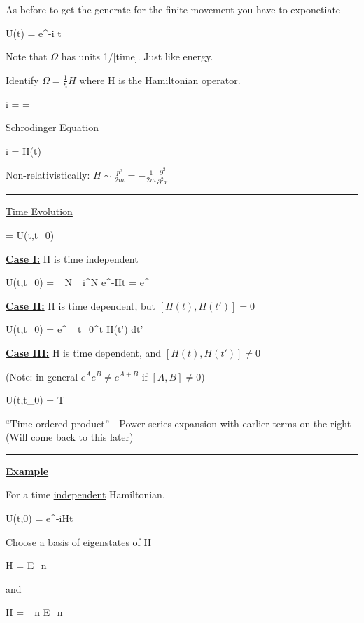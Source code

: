 {As before to get the generate for the finite movement you have to exponetiate

\be
U(t) = e^{-i \Omega t}
\ee

Note that $\Omega$ has units 1/[time].  
Just like energy.

Identify $\Omega = \frac{1}{\hbar}H$  where H is the Hamiltonian operator.


\be
i \ket{\psi} = \Omega \ket{\psi} =  \ket{\psi}
\ee


\underline{Schrodinger Equation}

\be
i \ket{\psi} = H(t) \ket{\psi}
\ee

Non-relativistically:  $H \sim \frac{p^2}{2m} = -\frac{1}{2m} \frac{\partial^2}{\partial^2 x}$

\noindent\rule{\textwidth}{1pt}

\underline{Time Evolution}

\be
{} = U(t,t_0) 
\ee


\textbf{\underline{Case I:}} H is time independent

\be
U(t,t_0) = \lim_{N\rightarrow\infty} \prod\limits_{i}^{N} e^{-H\Delta t}  = e^{}
\ee


\textbf{\underline{Case II:}} H is time dependent, but $[H(t), H(t')] = 0$

\be
U(t,t_0) =  e^{ \int_{t_0}^{t} H(t') dt'}
\ee


\textbf{\underline{Case III:}} H is time dependent, and $[H(t), H(t')] \ne 0$

(Note: in general $e^A e^B \ne e^{A+B}$ if $[A,B] \ne 0$)

\be
U(t,t_0) =  T 
\ee

``Time-ordered product'' - Power series expansion with earlier terms on the right
(Will come back to this later)


\noindent\rule{\textwidth}{1pt}

\textbf{\underline{Example}}

For a time \underline{independent} Hamiltonian.

\be
U(t,0) = e^{-iHt}
\ee

Choose a basis of eigenstates of H

\be
H = E_n
\ee

and 

\be
H = \sum\limits_{n} E_n 
\ee

}
